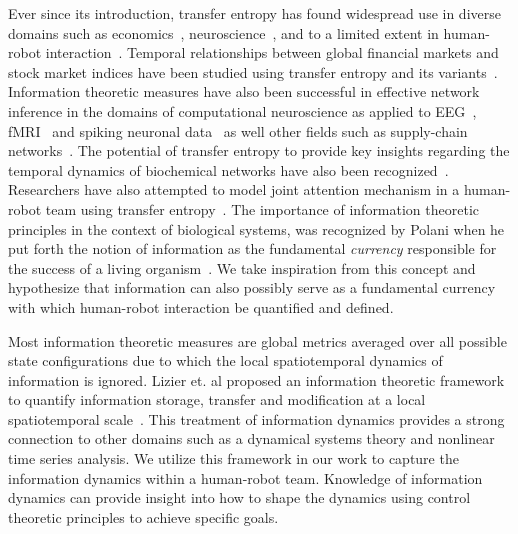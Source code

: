\documentclass[letterpaper, 10 pt, conference]{ieeeconf}  %
\begin{document}
Ever since its introduction, transfer entropy has found widespread use in diverse domains such as economics~\cite{marschinski2002analysing}, neuroscience~\cite{ito2011extending}, and to a limited extent in human-robot interaction~\cite{sumioka2008learning}. Temporal relationships between global financial markets and stock market indices have been studied using transfer entropy and its variants~\cite{he2017comparison}. Information theoretic measures have also been successful in effective network inference in the domains of computational neuroscience as applied to EEG~\cite{madulara2012eeg}, fMRI~\cite{lizier2011multivariate} and spiking neuronal data~\cite{thivierge2014scale} as well other fields such as supply-chain networks~\cite{rodewald2015using}. The potential of transfer entropy to provide key insights regarding the temporal dynamics of biochemical networks have also been recognized~\cite{fernandez2006role}. Researchers have also attempted to model joint attention mechanism in a human-robot team using transfer entropy~\cite{sumioka2007causality}. 
The importance of information theoretic principles in the context of biological systems, was recognized by Polani when he put forth the notion of information as the fundamental \textit{currency} responsible for the success of a living organism~\cite{polani2009information}. We take inspiration from this concept and hypothesize that information can also possibly serve as a fundamental currency with which human-robot interaction be quantified and defined.

Most information theoretic measures are global metrics averaged over all possible state configurations due to which the local spatiotemporal dynamics of information is ignored. Lizier et. al proposed an information theoretic framework to quantify information storage, transfer and modification at a local spatiotemporal scale~\cite{lizier2008local}. This treatment of information dynamics provides a strong connection to other domains such as a dynamical systems theory and nonlinear time series analysis. We utilize this framework in our work to capture the information dynamics within a human-robot team.  Knowledge of information dynamics can provide insight into how to shape the dynamics using control theoretic principles to achieve specific goals. 

\end{document}
